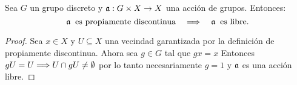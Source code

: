 \begin{ejercicio}\label{ej:32}
  Sea $G$ un grupo discreto y $\mathfrak{a}:G\times X\rightarrow X$ una acci\'on de grupos. Entonces:
  \[
    \mathfrak{a}\;\;\text{es propiamente discontinua} \quad\Longrightarrow\quad \mathfrak{a}\;\;\text{es libre}.
  \]
\end{ejercicio}
\begin{proof}%
  Sea $x\in X$ y $U\subseteq X$ una vecindad garantizada por la definici\'on de propiamente
  discontinua. Ahora sea $g\in G$ tal que $g x=x$ Entonces $gU=U\Longrightarrow U\cap gU\neq\emptyset$
  por lo tanto necesariamente $g=1$ y $\mathfrak{a}$ es una acci\'on libre.
\end{proof}%


